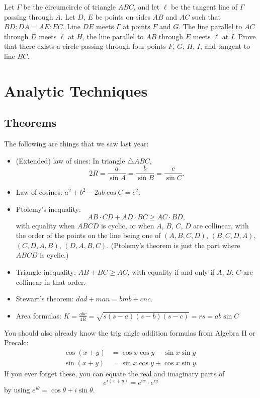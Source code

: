\documentclass{scrartcl}
\providecommand{\ii}{\item}
\begin{document}
\begin{niceprob}[Japan 2014/4]
	Let $\Gamma$ be the circumcircle of triangle $ABC$,
	and let $\ell$ be the tangent line of $\Gamma$ passing through $A$.
	Let $D$, $E$ be points on sides $AB$ and $AC$ such that $BD : DA = AE : EC$.
	Line $DE$ meets $\Gamma$ at points $F$ and $G$.
	The line parallel to $AC$ through $D$ meets $\ell$ at $H$,
	the line parallel to $AB$ through $E$ meets $\ell$ at $I$.
	Prove that there exists a circle passing through four points $F$, $G$, $H$, $I$,
	and tangent to line $BC$.
\end{niceprob}

\pagebreak

\section{Analytic Techniques}
\subsection{Theorems}
The following are things that we saw last year:
\begin{itemize}
	\ii (Extended) law of sines: In triangle $\triangle ABC$,
	\[2R = \frac{a}{\sin A} = \frac{b}{\sin B} = \frac{c}{\sin C}.\]
	\ii Law of cosines: $a^2 +  b^2 - 2ab\cos C = c^2$.
	\ii Ptolemy's inequality:
	\[AB\cdot CD + AD\cdot BC \ge AC\cdot BD,\]
	with equality when $ABCD$ is cyclic, or when
	$A$, $B$, $C$, $D$ are collinear, with the order of the points on the line
	being one of $(A,B,C,D)$, $(B,C,D,A)$, $(C,D,A,B)$, $(D,A,B,C)$.
	(Ptolemy's theorem is just the part where $ABCD$ is cyclic.)
	\ii Triangle inequality: $AB + BC \ge AC$, with equality if and only if
	$A$, $B$, $C$ are collinear in that order.
	\ii Stewart's theorem: $dad + man = bmb + cnc$.
	\ii Area formulas:
	$K = \frac{abc}{4R} = \sqrt{s(s - a)(s - b)(s - c)} = rs = ab\sin C$
\end{itemize}

You should also already know the trig angle addition formulas
from Algebra II or Precalc:
\begin{align*}
	\cos(x + y) &= \cos x\cos y - \sin x\sin y\\
	\sin(x + y) &= \sin x\cos y + \cos x \sin y.
\end{align*}
If you ever forget these, you can equate the real and imaginary parts of
\[e^{i(x + y)} = e^{ix} \cdot e^{iy}\]
by using $e^{i\theta} = \cos \theta + i\sin \theta$.
\end{document}
